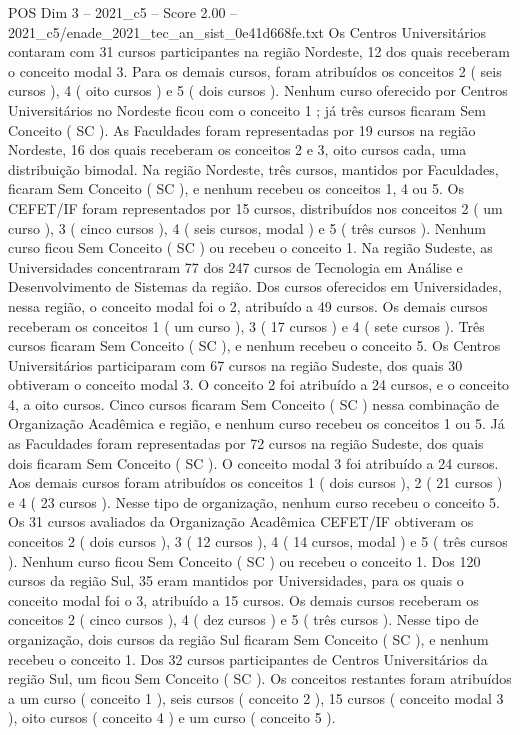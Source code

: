 \begin{textsample}{POS Dim 3 – 2021\_c5 – Score 2.00 – 2021\_c5/enade\_2021\_tec\_an\_sist\_0e41d668fe.txt}
Os Centros Universitários contaram com 31 cursos participantes na região Nordeste, 12 dos quais receberam o conceito modal 3.
Para os demais cursos, foram atribuídos os conceitos 2 ( seis cursos ), 4 ( oito cursos ) e 5 ( dois cursos ).
Nenhum curso oferecido por Centros Universitários no Nordeste ficou com o conceito 1 ; já três cursos ficaram Sem Conceito ( SC ).
As Faculdades foram representadas por 19 cursos na região Nordeste, 16 dos quais receberam os conceitos 2 e 3, oito cursos cada, uma distribuição bimodal.
Na região Nordeste, três cursos, mantidos por Faculdades, ficaram Sem Conceito ( SC ), e nenhum recebeu os conceitos 1, 4 ou 5.
Os CEFET/IF foram representados por 15 cursos, distribuídos nos conceitos 2 ( um curso ), 3 ( cinco cursos ), 4 ( seis cursos, modal ) e 5 ( três cursos ).
Nenhum curso ficou Sem Conceito ( SC ) ou recebeu o conceito 1.
Na região Sudeste, as Universidades concentraram 77 dos 247 cursos de Tecnologia em Análise e Desenvolvimento de Sistemas da região.
Dos cursos oferecidos em Universidades, nessa região, o conceito modal foi o 2, atribuído a 49 cursos.
Os demais cursos receberam os conceitos 1 ( um curso ), 3 ( 17 cursos ) e 4 ( sete cursos ).
Três cursos ficaram Sem Conceito ( SC ), e nenhum recebeu o conceito 5.
Os Centros Universitários participaram com 67 cursos na região Sudeste, dos quais 30 obtiveram o conceito modal 3.
O conceito 2 foi atribuído a 24 cursos, e o conceito 4, a oito cursos.
Cinco cursos ficaram Sem Conceito ( SC ) nessa combinação de Organização Acadêmica e região, e nenhum curso recebeu os conceitos 1 ou 5.
Já as Faculdades foram representadas por 72 cursos na região Sudeste, dos quais dois ficaram Sem Conceito ( SC ).
O conceito modal 3 foi atribuído a 24 cursos.
Aos demais cursos foram atribuídos os conceitos 1 ( dois cursos ), 2 ( 21 cursos ) e 4 ( 23 cursos ).
Nesse tipo de organização, nenhum curso recebeu o conceito 5.
Os 31 cursos avaliados da Organização Acadêmica CEFET/IF obtiveram os conceitos 2 ( dois cursos ), 3 ( 12 cursos ), 4 ( 14 cursos, modal ) e 5 ( três cursos ).
Nenhum curso ficou Sem Conceito ( SC ) ou recebeu o conceito 1.
Dos 120 cursos da região Sul, 35 eram mantidos por Universidades, para os quais o conceito modal foi o 3, atribuído a 15 cursos.
Os demais cursos receberam os conceitos 2 ( cinco cursos ), 4 ( dez cursos ) e 5 ( três cursos ).
Nesse tipo de organização, dois cursos da região Sul ficaram Sem Conceito ( SC ), e nenhum recebeu o conceito 1.
Dos 32 cursos participantes de Centros Universitários da região Sul, um ficou Sem Conceito ( SC ).
Os conceitos restantes foram atribuídos a um curso ( conceito 1 ), seis cursos ( conceito 2 ), 15 cursos ( conceito modal 3 ), oito cursos ( conceito 4 ) e um curso ( conceito 5 ).

\end{textsample}

